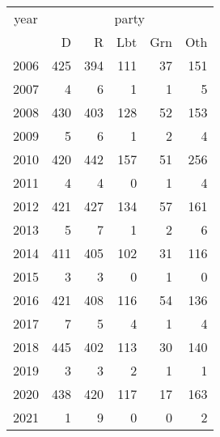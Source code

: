 \footnotesize\begin{tabular}[t]{lrrrrr}
\toprule
\multicolumn{1}{c}{year} & \multicolumn{5}{c}{party} \\
\cmidrule(l{3pt}r{3pt}){1-1} \cmidrule(l{3pt}r{3pt}){2-6}
  & D & R & Lbt & Grn & Oth\\
\midrule
2006 & 425 & 394 & 111 & 37 & 151\\
2007 & 4 & 6 & 1 & 1 & 5\\
2008 & 430 & 403 & 128 & 52 & 153\\
2009 & 5 & 6 & 1 & 2 & 4\\
2010 & 420 & 442 & 157 & 51 & 256\\
2011 & 4 & 4 & 0 & 1 & 4\\
2012 & 421 & 427 & 134 & 57 & 161\\
2013 & 5 & 7 & 1 & 2 & 6\\
2014 & 411 & 405 & 102 & 31 & 116\\
2015 & 3 & 3 & 0 & 1 & 0\\
2016 & 421 & 408 & 116 & 54 & 136\\
2017 & 7 & 5 & 4 & 1 & 4\\
2018 & 445 & 402 & 113 & 30 & 140\\
2019 & 3 & 3 & 2 & 1 & 1\\
2020 & 438 & 420 & 117 & 17 & 163\\
2021 & 1 & 9 & 0 & 0 & 2\\
\bottomrule
\end{tabular}
